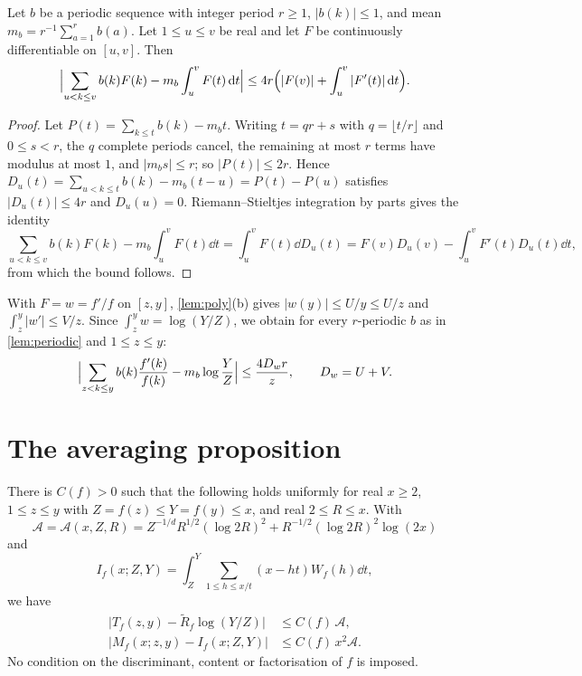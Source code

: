 \begin{lemma}\label{lem:periodic}
Let $b$ be a periodic sequence with integer period $r\ge1$, $|b(k)|\le1$, and mean $m_b=r^{-1}\sum_{a=1}^rb(a)$. Let $1\le u\le v$ be real and let $F$ be continuously differentiable on $[u,v]$. Then
\[
\Bigl|\sum_{u<k\le v}b(k)F(k)-m_b\int_u^vF(t)\,\mathrm d t\Bigr|\le4r\Bigl(|F(v)|+\int_u^v|F'(t)|\,\mathrm d t\Bigr).
\]
\end{lemma}

\begin{proof}
Let $P(t)=\sum_{k\le t}b(k)-m_bt$. Writing $t=qr+s$ with $q=\lfloor t/r\rfloor$ and $0\le s<r$, the $q$ complete periods cancel, the remaining at most $r$ terms have modulus at most $1$, and $|m_bs|\le r$; so $|P(t)|\le2r$. Hence $D_u(t)=\sum_{u<k\le t}b(k)-m_b(t-u)=P(t)-P(u)$ satisfies $|D_u(t)|\le4r$ and $D_u(u)=0$. Riemann--Stieltjes integration by parts gives the identity
\[
\sum_{u<k\le v}b(k)F(k)-m_b\int_u^vF(t)\dd t=\int_u^vF(t)\dd D_u(t)=F(v)D_u(v)-\int_u^vF'(t)D_u(t)\dd t,
\]
from which the bound follows.
\end{proof}

With $F=w=f'/f$ on $[z,y]$, \cref{lem:poly}(b) gives $|w(y)|\le U/y\le U/z$ and $\int_z^y|w'|\le V/z$. Since $\int_z^yw=\log(Y/Z)$, we obtain for every $r$-periodic $b$ as in \cref{lem:periodic} and $1\le z\le y$:
\begin{equation}\label{eq:periodic-w}
\Bigl|\sum_{z<k\le y}b(k)\frac{f'(k)}{f(k)}-m_b\log\frac YZ\Bigr|\le\frac{4D_wr}z,\qquad D_w=U+V.
\end{equation}

\section{The averaging proposition}

\begin{proposition}\label{prop:averaging}
There is $C(f)>0$ such that the following holds uniformly for real $x\ge2$, $1\le z\le y$ with $Z=f(z)\le Y=f(y)\le x$, and real $2\le R\le x$. With
\[
\mathcal A=\mathcal A(x,Z,R)=Z^{-1/d}R^{1/2}(\log2R)^2+R^{-1/2}(\log2R)^2\log(2x)
\]
and
\begin{equation}\label{eq:If}
I_f(x;Z,Y)=\int_Z^Y\sum_{1\le h\le x/t}(x-ht)W_f(h)\dd t,
\end{equation}
we have
\begin{align}
\bigl|T_f(z,y)-\widetilde R_f\log(Y/Z)\bigr|&\le C(f)\,\mathcal A,\label{eq:avg1}\\
\bigl|M_f(x;z,y)-I_f(x;Z,Y)\bigr|&\le C(f)\,x^2\mathcal A.\label{eq:avg2}
\end{align}
No condition on the discriminant, content or factorisation of $f$ is imposed.
\end{proposition}

